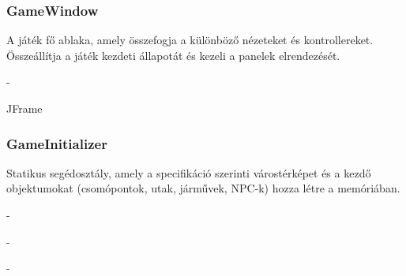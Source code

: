 \subsubsection{GameWindow}
\begin{class-template-responsibility}
    A játék fő ablaka, amely összefogja a különböző nézeteket és kontrollereket. Összeállítja a játék kezdeti állapotát és kezeli a panelek elrendezését.
\end{class-template-responsibility}
\begin{class-template-interface}
    -
\end{class-template-interface}
\begin{class-template-baseclass}
    JFrame
\end{class-template-baseclass}
\begin{class-template-attribute}
\end{class-template-attribute}
\begin{class-template-method}
\end{class-template-method}

\subsubsection{GameInitializer}
\begin{class-template-responsibility}
    Statikus segédosztály, amely a specifikáció szerinti várostérképet és a kezdő objektumokat (csomópontok, utak, járművek, NPC-k) hozza létre a memóriában.
\end{class-template-responsibility}
\begin{class-template-interface}
    -
\end{class-template-interface}
\begin{class-template-baseclass}
    -
\end{class-template-baseclass}
\begin{class-template-attribute}
    -
\end{class-template-attribute}
\begin{class-template-method}
\end{class-template-method}

